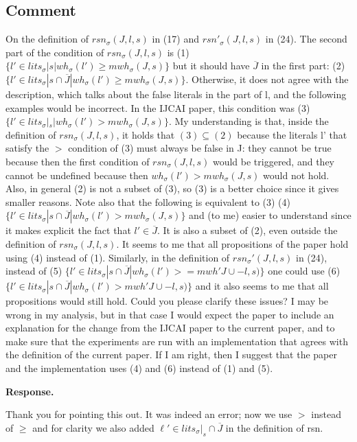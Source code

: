 \documentclass[11pt]{article}
\newcommand{\lits}{\mathit{lits}}
\theoremstyle{definition}
\newcommand{\revieweranswered}{\subsection{Comment}}
\newenvironment{response}{
    \color{blue} \textbf{Response.}
}{
}
\begin{document}
\vspace{0.5cm}

\revieweranswered
On the definition of $rsn_{\sigma}(J,l,s)$ in (17) and $rsn'_{\sigma}(J,l,s)$ in (24).
The second part of the condition of $rsn_{\sigma}(J,l,s)$ is
(1) $\{ l' \in lits_{\sigma}|s | wh_{\sigma}(l') \geq mwh_{\sigma}(J,s) \}$
but it should have $\overline{J}$ in the first part:
(2) $\{ l' \in lits_{\sigma}|s \cap \overline{J} | wh_{\sigma}(l') \geq mwh_{\sigma}(J,s) \}$.
Otherwise, it does not agree with the description, which talks about the false literals in
the part of l, and the following examples would be incorrect.
In the IJCAI paper, this condition was
(3) $\{ l' \in lits_{\sigma}|_s | wh_{\sigma}(l') > mwh_{\sigma}(J,s) \}$.
My understanding is that, inside the definition of $rsn_{\sigma}(J,l,s)$, it holds that
$(3) \subseteq (2)$
because the literals l' that satisfy the $>$ condition of (3) must always be false in J:
they cannot be true because then the first condition of $rsn_{\sigma}(J,l,s)$
would be triggered, and they cannot be undefined because then
$wh_{\sigma}(l') > mwh_{\sigma}(J,s)$ would not hold.
Also, in general (2) is not a subset of (3),
so (3) is a better choice since it gives smaller reasons.
Note also that the following is equivalent to (3)
(4) $\{ l' \in lits_{\sigma}|s \cap \overline{J} | wh_{\sigma}(l') > mwh_{\sigma}(J,s) \}$
and (to me) easier to understand since it makes explicit the fact that $l' \in \overline{J}$.
It is also a subset of (2), even outside the definition of $rsn_\sigma(J,l,s)$.
It seems to me that all propositions of the paper hold using (4) instead of (1).
Similarly, in the definition of $rsn_{\sigma}'(J,l,s)$ in (24), instead of
(5) $\{ l' \in lits_{\sigma}|s \cap \overline{J} | wh_{\sigma}(l') >= mwh'{J \cup {-l},s)}\}$
one could use
(6) $\{ l' \in lits_{\sigma}|s \cap \overline{J} | wh_{\sigma}(l') > mwh'{J \cup {-l},s)}\}$
and it also seems to me that all propositions would still hold.
Could you please clarify these issues?
I may be wrong in my analysis, but in that case I would expect the paper to include an explanation
for the change from the IJCAI paper to the current paper, and to make sure that the experiments are
run with an implementation that agrees with the definition of the current paper.
If I am right, then I suggest that the paper and the implementation uses (4) and (6) instead of (1) and (5).

\begin{response}    
Thank you for pointing this out.
It was indeed an error; now we use $>$ instead of $\ge$ and for clarity we also added $\ell' \in \lits_{\sigma}|_s \cap \overline{J}$ in the definition of rsn.
\end{response}
\end{document}
